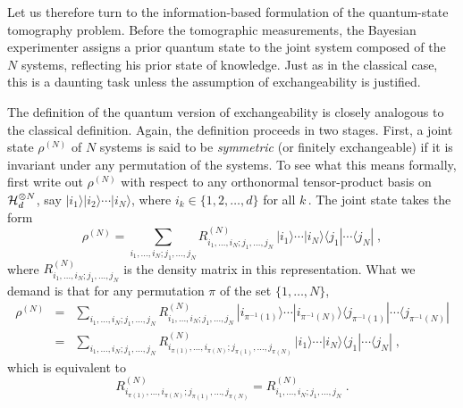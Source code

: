 \documentclass[12pt,aps,eqsecnum]{revtex4-1}
\begin{document}
Let us therefore turn to the information-based formulation of the
quantum-state tomography problem. Before the tomographic
measurements, the Bayesian experimenter assigns a prior quantum
state to the joint system composed of the $N$ systems, reflecting
his prior state of knowledge.  Just as in the classical case, this
is a daunting task unless the assumption of exchangeability is
justified.

The definition of the quantum version of exchangeability is
closely analogous to the classical definition.  Again, the
definition proceeds in two stages.  First, a joint state
$\rho^{(N)}$ of $N$ systems is said to be {\it symmetric\/} (or
finitely exchangeable) if it is invariant under any permutation of
the systems.  To see what this means formally, first write out
$\rho^{(N)}$ with respect to any orthonormal tensor-product basis
on ${\cal H}_d^{\otimes N}$, say
$|i_1\rangle|i_2\rangle\cdots|i_N\rangle$, where
$i_k\in\{1,2,\ldots,d\}$ for all $k\,$.  The joint state takes the
form
\begin{equation}
\rho^{(N)}=\sum_{i_1,\ldots,i_N;j_1,\ldots,j_N}
R^{(N)}_{i_1,\ldots,i_N;j_1,\ldots,j_N}\,
|i_1\rangle\cdots|i_N\rangle \langle j_1| \cdots\langle j_N|\;,
\end{equation}
where $R^{(N)}_{i_1,\ldots,i_N;j_1,\ldots,j_N}$ is the density
matrix in this representation.  What we demand is that for any
permutation $\pi$ of the set $\{1,\ldots,N\}$,
\begin{eqnarray}
\rho^{(N)}&=&\sum_{i_1,\ldots,i_N;j_1,\ldots,j_N}
R^{(N)}_{i_1,\ldots,i_N;j_1,\ldots,j_N}\,
|i_{\pi^{-1}(1)}\rangle\cdots|i_{\pi^{-1}(N)}\rangle
\langle j_{\pi^{-1}(1)}|\cdots\langle j_{\pi^{-1}(N)}|\nonumber\\
&=&\sum_{i_1,\ldots,i_N;j_1,\ldots,j_N}
R^{(N)}_{i_{\pi(1)},\ldots,i_{\pi(N)};j_{\pi(1)},\ldots,j_{\pi(N)}}\,
|i_1\rangle\cdots|i_N\rangle \langle j_1| \cdots\langle j_N|
\;,
\end{eqnarray}
which is equivalent to
\begin{equation}
R^{(N)}_{i_{\pi(1)},\ldots,i_{\pi(N)};j_{\pi(1)},\ldots,j_{\pi(N)}}
=R^{(N)}_{i_1,\ldots,i_N;j_1,\ldots,j_N}\;.
\end{equation}
\end{document}
